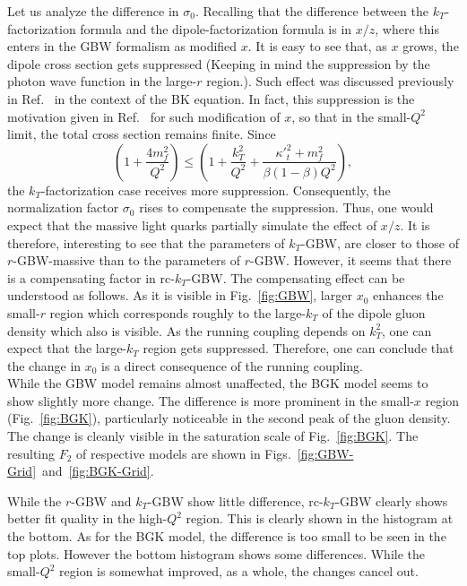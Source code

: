 \documentclass[11pt]{article}
\numberwithin{equation}{section}
\numberwithin{table}{section}
\numberwithin{figure}{section}
\begin{document}
Let us analyze the difference in $\sigma_0$. 
Recalling that the difference between the $k_T$-factorization formula and the dipole-factorization formula is in $x/z$, where this enters in the GBW formalism as modified $x$. It is easy to see that, as $x$ grows, the dipole cross section gets suppressed (Keeping in mind the suppression by the photon wave function in the large-$r$ region.). Such effect was discussed previously in Ref.~\cite{Kutak:2004ym} in the context of the BK equation. In fact, this suppression is the motivation given in Ref.~\cite{Golec-Biernat:1998zce} for such modification of $x$, so that in the small-$Q^2$ limit, the total cross section remains finite.    
Since 
%
\begin{equation}
\left(1+\frac{4 m_f^2}{Q^2}\right)\leq\left(1+\frac{k_T^2}{Q^2}+\frac{{\kappa'}_t^2+m_f^2}{\beta(1-\beta)Q^2}\right),
\end{equation}
%
the $k_T$-factorization case receives more suppression. Consequently, the normalization factor $\sigma_0$ rises to compensate the suppression. Thus, one would expect that the massive light quarks partially simulate the effect of $x/z$.
It is therefore, interesting to see that the parameters of $k_T$-GBW, are closer to those of $r$-GBW-massive than to the parameters of $r$-GBW.    
However, it seems that there is a compensating factor in rc-$k_T$-GBW. 
The compensating effect can be understood as follows. As it is visible in  Fig.~\ref{fig:GBW}, larger $x_0$ enhances the small-$r$ region which corresponds roughly to the large-$k_T$ of the dipole gluon density which also is visible. 
As the running coupling depends on $k_T^2$,  one can expect that the large-$k_T$ region gets suppressed.  Therefore, one can conclude that the change in $x_0$ is a direct consequence of the running coupling.\\
While the GBW model remains almost unaffected, the BGK model seems to show slightly more change. The difference is more prominent in the small-$x$ region (Fig.~\ref{fig:BGK}), particularly noticeable in the second peak of the gluon density.
The change is cleanly visible in the saturation scale of Fig.~\ref{fig:BGK}. 
The resulting $F_2$ of respective models are shown in Figs.~\ref{fig:GBW-Grid}~and~\ref{fig:BGK-Grid}.

While the $r$-GBW and $k_T$-GBW show little difference, rc-$k_T$-GBW clearly shows better fit quality in the high-$Q^2$ region. This is clearly shown in the histogram at the bottom. 
As for the BGK model, the difference is too small to be seen in the top plots. However the bottom histogram shows some differences. While the small-$Q^2$ region is somewhat improved, as a whole, the changes cancel out. 
\end{document}
